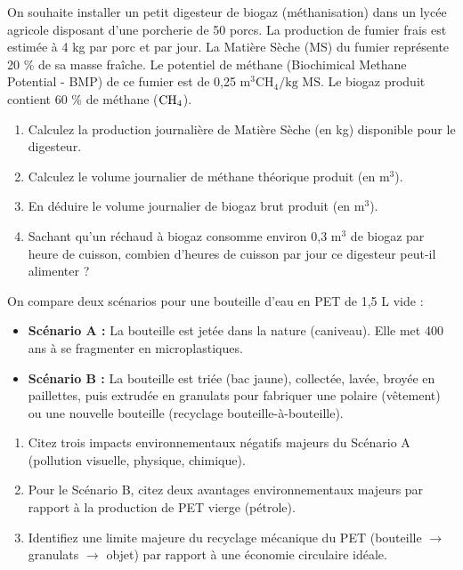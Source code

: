 \documentclass[11pt]{article}
\begin{document}
\begin{exercice}
On souhaite installer un petit digesteur de biogaz (méthanisation) dans un lycée agricole disposant d'une porcherie de 50 porcs. La production de fumier frais est estimée à 4 kg par porc et par jour. La Matière Sèche (MS) du fumier représente 20 \% de sa masse fraîche. Le potentiel de méthane (Biochimical Methane Potential - BMP) de ce fumier est de 0,25 $\text{m}^3 \text{CH}_4 / \text{kg MS}$. Le biogaz produit contient 60 \% de méthane ($\ce{CH4}$).

\begin{enumerate}
    \item Calculez la production journalière de Matière Sèche (en kg) disponible pour le digesteur.
    \item Calculez le volume journalier de méthane théorique produit (en $\text{m}^3$).
    \item En déduire le volume journalier de biogaz brut produit (en $\text{m}^3$).
    \item Sachant qu'un réchaud à biogaz consomme environ 0,3 $\text{m}^3$ de biogaz par heure de cuisson, combien d'heures de cuisson par jour ce digesteur peut-il alimenter ?
\end{enumerate}
\end{exercice}

\begin{exercice}
On compare deux scénarios pour une bouteille d'eau en PET de 1,5 L vide :
\begin{itemize}
    \item \textbf{Scénario A :} La bouteille est jetée dans la nature (caniveau). Elle met 400 ans à se fragmenter en microplastiques.
    \item \textbf{Scénario B :} La bouteille est triée (bac jaune), collectée, lavée, broyée en paillettes, puis extrudée en granulats pour fabriquer une polaire (vêtement) ou une nouvelle bouteille (recyclage bouteille-à-bouteille).
\end{itemize}

\begin{enumerate}
    \item Citez trois impacts environnementaux négatifs majeurs du Scénario A (pollution visuelle, physique, chimique).
    \item Pour le Scénario B, citez deux avantages environnementaux majeurs par rapport à la production de PET vierge (pétrole).
    \item Identifiez une limite majeure du recyclage mécanique du PET (bouteille $\rightarrow$ granulats $\rightarrow$ objet) par rapport à une économie circulaire idéale.
\end{enumerate}
\end{exercice}
\end{document}
